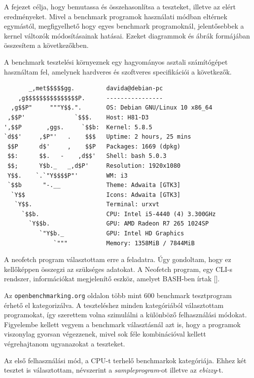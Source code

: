 
A fejezet célja, hogy bemutassa és összehasonlítsa a teszteket, illetve az elért eredményeket. Mivel a benchmark programok használati módban eltérnek egymástól, megfigyelhető hogy egyes benchmark programoknál, jelentősebbek a kernel változók módosításainak hatásai.
Ezeket diagrammok és ábrák formájában összesítem a következőkben.

A benchmark tesztelési környeznek egy hagyományos asztali számítógépet használtam fel, amelynek hardveres és szoftveres specifikációi a következők.

\begin{lstlisting}
       _,met$$$$$gg.         davida@debian-pc 
    ,g$$$$$$$$$$$$$$$P.      ---------------- 
  ,g$$P"     """Y$$.".       OS: Debian GNU/Linux 10 x86_64 
 ,$$P'              `$$$.    Host: H81-D3 
',$$P       ,ggs.     `$$b:  Kernel: 5.8.5 
`d$$'     ,$P"'   .    $$$   Uptime: 2 hours, 25 mins 
 $$P      d$'     ,    $$P   Packages: 1669 (dpkg) 
 $$:      $$.   -    ,d$$'   Shell: bash 5.0.3 
 $$;      Y$b._   _,d$P'     Resolution: 1920x1080 
 Y$$.    `.`"Y$$$$P"'        WM: i3 
 `$$b      "-.__             Theme: Adwaita [GTK3] 
  `Y$$                       Icons: Adwaita [GTK3] 
   `Y$$.                     Terminal: urxvt 
     `$$b.                   CPU: Intel i5-4440 (4) 3.300GHz 
       `Y$$b.                GPU: AMD Radeon R7 265 1024SP 
          `"Y$b._            GPU: Intel HD Graphics 
              `"""           Memory: 1358MiB / 7844MiB
\end{lstlisting}
A neofetch program választottam erre a feladatra. Úgy gondoltam, hogy ez kellőképpen összegzi az szükséges adatokat. A Neofetch program, egy CLI-s rendszer, információkat megjelenítő eszköz, amelyet BASH-ben írtak [].


Az \texttt{openbenchmarking.org} oldalon több mint 600 benchmark tesztprogram érhető el kategorizálva. A teszteléshez minden kategóriából választottam programokat, így szerettem volna szimulálni a különböző felhasználási módokat. Figyelembe kellett vegyem a benchmark választásnál azt is, hogy a programok viszonylag gyorsan végezzenek, mivel sok féle kombinációval kellett végrehajtanom ugyanazokat a teszteket. 


Az első felhasználási mód, a CPU-t terhelő benchmarkok kategóriája. Ehhez két tesztet is választottam, névszerint a \textit{sampleprogram}-ot illetve az \textit{ebizzy}-t.

